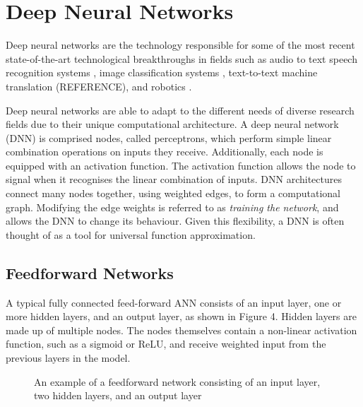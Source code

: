 \section{Deep Neural Networks}\label{dnn}
Deep neural networks are the technology responsible for some of the most recent state-of-the-art technological breakthroughs in fields such as audio to text speech recognition systems \cite{Hinton2012}, image classification systems \cite{Krizhevsky2012, Simonyan2014, Szegedy2015, He2016}, text-to-text machine translation (REFERENCE), and robotics \cite{Mnih2015, Lillicrap2015, Schulman2015, Schulman2015highdimensional}.

Deep neural networks are able to adapt to the different needs of diverse research fields due to their unique computational architecture. A deep neural network (DNN) is comprised nodes, called perceptrons, which perform simple linear combination operations on inputs they receive. Additionally, each node is equipped with an activation function. The activation function allows the node to signal when it recognises the linear combination of inputs. DNN architectures connect many nodes together, using weighted edges, to form a computational graph. Modifying the edge weights is referred to as \textit{training the network}, and allows the DNN to change its behaviour. Given this flexibility, a DNN is often thought of as a tool for universal function approximation.



\subsection{Feedforward Networks}
A typical fully connected feed-forward ANN consists of an input layer, one or more hidden layers, and an output layer, as shown in Figure 4. Hidden layers are made up of multiple nodes. The nodes themselves contain a non-linear activation function, such as a sigmoid or ReLU, and receive weighted input from the previous layers in the model.

\begin{figure}[h]
	\centering
	
	\caption[Feedforward network example]{An example of a feedforward network consisting of an input layer, two hidden layers, and an output layer}
	\label{fig:2302_feedforward_network}
\end{figure}



